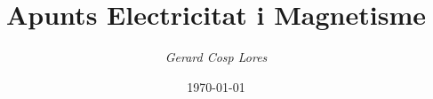 \documentclass[12pt]{article}
\title{\textbf{Apunts Electricitat i Magnetisme}}
\author{\textit{Gerard Cosp Lores}}
\date{\today}
\begin{document}
\justifying

\maketitle
\end{document}

